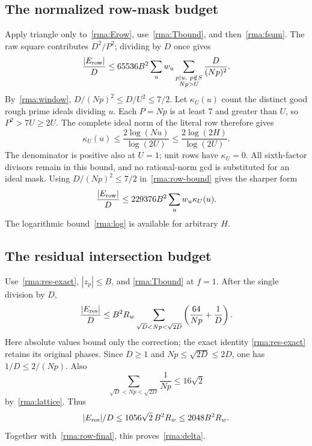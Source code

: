 \subsection{The normalized row-mask budget}
Apply triangle only to~\eqref{rma:Erow}, use~\eqref{rma:Tbound},
and then~\eqref{rma:fsum}. The raw square contributes
$D^2/P^2$; dividing by $D$ once gives
\begin{equation}\label{rma:row-bound}
 \frac{|E_{\rm row}|}{D}
 \le65536B^2
       \sum_u w_u\sum_{\substack{p\mid u,\ p\notin S\\Np>U}}
                                      \frac{D}{(Np)^2}.
\end{equation}
By~\eqref{rma:window}, $D/(Np)^2\le D/U^2\le7/2$.
Let $\kappa_U(u)$ count the distinct good rough prime ideals dividing $u$.
Each $P=Np$ is at least $7$ and greater than $U$, so $P^2>7U\ge2U$.
The complete ideal norm of the literal row therefore gives
\begin{equation}\label{rma:log}
 \kappa_U(u)\le\frac{2\log(Nu)}{\log(2U)}
          \le\frac{2\log(2H)}{\log(2U)}.
\end{equation}
The denominator is positive also at $U=1$; unit rows have $\kappa_U=0$.
All sixth-factor divisors remain in this bound, and no rational-norm gcd
is substituted for an ideal mask. Using $D/(Np)^2\le7/2$ in~\eqref{rma:row-bound} gives the sharper form
\begin{equation}\label{rma:row-final}
 \frac{|E_{\rm row}|}{D}\le229376B^2
                              \sum_u w_u\kappa_U(u).
\end{equation}
The logarithmic bound~\eqref{rma:log} is available for arbitrary $H$.

\subsection{The residual intersection budget}
Use~\eqref{rma:res-exact}, $|z_p|\le B$, and
\eqref{rma:Tbound} at $f=1$. After the single division by $D$,
\begin{equation}\label{rma:res-bound}
 \frac{|E_{\rm res}|}{D}
 \le B^2R_w\sum_{\sqrt D<Np<\sqrt{2D}}
       \left(\frac{64}{Np}+\frac1D\right).
\end{equation}
Here absolute values bound only the correction; the exact identity
\eqref{rma:res-exact} retains its original phases. Since $D\ge1$ and
$Np\le\sqrt{2D}\le2D$, one has $1/D\le2/(Np)$. Also
\begin{equation}\label{rma:reciprocal}
 \sum_{\sqrt D<Np<\sqrt{2D}}\frac1{Np}\le16\sqrt2
\end{equation}
by~\eqref{rma:lattice}. Thus
\[
 |E_{\rm res}|/D\le1056\sqrt2\,B^2R_w\le2048B^2R_w.
\]
Together with~\eqref{rma:row-final}, this proves~\eqref{rma:delta}.

